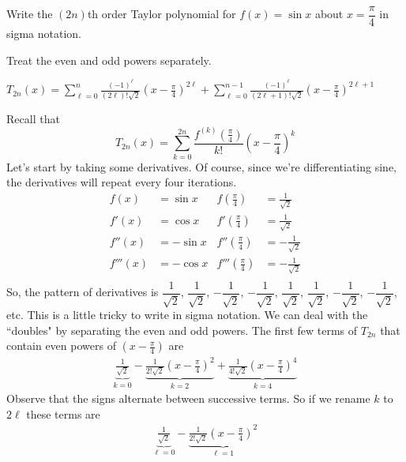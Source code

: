 \begin{question}
Write the $(2n)$th order Taylor polynomial for $f(x)=\sin x$ about $x=\dfrac{\pi}{4}$ in sigma notation.
\end{question}
\begin{hint}
Treat the even and odd powers separately.
\end{hint}
\begin{answer}
$T_{2n}(x)=\sum_{\ell=0}^{n}\frac{(-1)^\ell}{(2\ell)!\sqrt{2}}\left(x-\frac{\pi}{4}\right)^{2\ell}
+\sum_{\ell=0}^{n-1}\frac{(-1)^\ell}{(2\ell+1)!\sqrt{2}}\left(x-\frac{\pi}{4}\right)^{2\ell+1}$
\end{answer}
\begin{solution}
Recall that
\begin{equation*}
T_{2n}(x)=\sum_{k=0}^{2n} \frac{f^{(k)}\left(\frac{\pi}{4}\right)}{k!}\left(x-\frac{\pi}{4}\right)^k
\end{equation*}
Let's start by taking some derivatives. Of course, since we're differentiating sine, the derivatives will repeat every four iterations.
\begin{align*}
f(x)&=\sin x & f\left(\frac{\pi}{4}\right)&=\frac{1}{\sqrt 2}\\
f'(x)&=\cos x & f'\left(\frac{\pi}{4}\right)&=\frac{1}{\sqrt{2}}\\
f''(x)&=-\sin x & f''\left(\frac{\pi}{4}\right)&=-\frac{1}{\sqrt 2}\\
f'''(x)&=-\cos x & f'''\left(\frac{\pi}{4}\right)&=-\frac{1}{\sqrt{2}}\\
\end{align*}
So, the pattern of derivatives is $\dfrac{1}{\sqrt{2}}$, $\dfrac{1}{\sqrt{2}}$, $-\dfrac{1}{\sqrt{2}}$, $-\dfrac{1}{\sqrt{2}}$, $\dfrac{1}{\sqrt{2}}$, $\dfrac{1}{\sqrt{2}}$, $-\dfrac{1}{\sqrt{2}}$, $-\dfrac{1}{\sqrt{2}}$, etc. This is a little tricky to write in sigma notation. We can deal with the ``doubles" by separating the even and odd powers. The first few terms of $T_{2n}$ that contain even powers of $\left(x-\frac{\pi}{4}\right)$ are
\begin{align*}
\underbrace{\frac{1}{\sqrt{2}}}_{k=0}
-\underbrace{\frac{1}{2!\sqrt{2}}\left(x-\frac{\pi}{4}\right)^{2}}_{k=2}
+\underbrace{\frac{1}{4!\sqrt{2}}\left(x-\frac{\pi}{4}\right)^{4}}_{k=4}
\end{align*}
Observe that the signs alternate between successive terms. So if we rename $k$ to $2\ell$ these terms are
\begin{align*}
\underbrace{\frac{1}{\sqrt{2}}}_{\ell=0}
-\underbrace{\frac{1}{2!\sqrt{2}}\left(x-\frac{\pi}{4}\right)^{2}}_{\ell=1}

\end{align*}
\end{solution}
